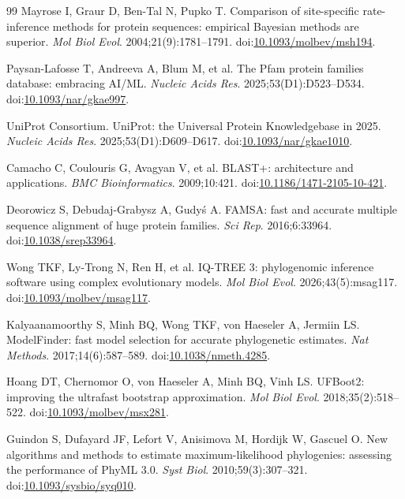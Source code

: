 \documentclass[11pt,a4paper]{article}
\begin{document}
\begin{thebibliography}{99}
Mayrose I, Graur D, Ben-Tal N, Pupko T. Comparison of site-specific rate-inference methods for protein sequences: empirical Bayesian methods are superior. \emph{Mol Biol Evol}. 2004;21(9):1781--1791. doi:\href{https://doi.org/10.1093/molbev/msh194}{10.1093/molbev/msh194}.

Paysan-Lafosse T, Andreeva A, Blum M, et al. The Pfam protein families database: embracing AI/ML. \emph{Nucleic Acids Res}. 2025;53(D1):D523--D534. doi:\href{https://doi.org/10.1093/nar/gkae997}{10.1093/nar/gkae997}.

UniProt Consortium. UniProt: the Universal Protein Knowledgebase in 2025. \emph{Nucleic Acids Res}. 2025;53(D1):D609--D617. doi:\href{https://doi.org/10.1093/nar/gkae1010}{10.1093/nar/gkae1010}.

Camacho C, Coulouris G, Avagyan V, et al. BLAST+: architecture and applications. \emph{BMC Bioinformatics}. 2009;10:421. doi:\href{https://doi.org/10.1186/1471-2105-10-421}{10.1186/1471-2105-10-421}.

Deorowicz S, Debudaj-Grabysz A, Gudy\'{s} A. FAMSA: fast and accurate multiple sequence alignment of huge protein families. \emph{Sci Rep}. 2016;6:33964. doi:\href{https://doi.org/10.1038/srep33964}{10.1038/srep33964}.

Wong TKF, Ly-Trong N, Ren H, et al. IQ-TREE 3: phylogenomic inference software using complex evolutionary models. \emph{Mol Biol Evol}. 2026;43(5):msag117. doi:\href{https://doi.org/10.1093/molbev/msag117}{10.1093/molbev/msag117}.

Kalyaanamoorthy S, Minh BQ, Wong TKF, von Haeseler A, Jermiin LS. ModelFinder: fast model selection for accurate phylogenetic estimates. \emph{Nat Methods}. 2017;14(6):587--589. doi:\href{https://doi.org/10.1038/nmeth.4285}{10.1038/nmeth.4285}.

Hoang DT, Chernomor O, von Haeseler A, Minh BQ, Vinh LS. UFBoot2: improving the ultrafast bootstrap approximation. \emph{Mol Biol Evol}. 2018;35(2):518--522. doi:\href{https://doi.org/10.1093/molbev/msx281}{10.1093/molbev/msx281}.

Guindon S, Dufayard JF, Lefort V, Anisimova M, Hordijk W, Gascuel O. New algorithms and methods to estimate maximum-likelihood phylogenies: assessing the performance of PhyML 3.0. \emph{Syst Biol}. 2010;59(3):307--321. doi:\href{https://doi.org/10.1093/sysbio/syq010}{10.1093/sysbio/syq010}.


\end{thebibliography}
\end{document}
